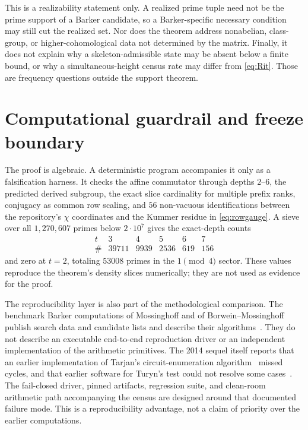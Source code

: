 \documentclass[11pt]{article}
\theoremstyle{definition}
\theoremstyle{remark}
\begin{document}
This is a realizability statement only.  A realized prime tuple need not be
the prime support of a Barker candidate, so a Barker-specific necessary
condition may still cut the realized set.  Nor does the theorem address
nonabelian, class-group, or higher-cohomological data not determined by the
matrix.  Finally, it does not explain why a skeleton-admissible state may be
absent below a finite bound, or why a simultaneous-height census rate may
differ from \eqref{eq:Rit}.  Those are frequency questions outside the
support theorem.

\section{Computational guardrail and freeze boundary}

The proof is algebraic.  A deterministic program accompanies it only as a
falsification harness.  It checks the affine commutator through depths
$2$--$6$, the predicted derived subgroup, the exact slice cardinality for
multiple prefix ranks, conjugacy as common row scaling, and $56$
non-vacuous identifications between the repository's $\chi$ coordinates
and the Kummer residue in \eqref{eq:rowgauge}.  A sieve over all
$1{,}270{,}607$ primes below $2\cdot10^7$ gives the exact-depth counts
\[
\begin{array}{c|rrrrr}
t&3&4&5&6&7\\ \hline
\#&39711&9939&2536&619&156
\end{array}
\]
and zero at $t=2$, totaling $53008$ primes in the $1\pmod4$ sector.  These
values reproduce the theorem's density slices numerically; they are not
used as evidence for the proof.

The reproducibility layer is also part of the methodological comparison.
The benchmark Barker computations of Mossinghoff and of
Borwein--Mossinghoff publish search data and candidate lists and describe
their algorithms~\cite{BM1,BM2}.  They do not describe an executable
end-to-end reproduction driver or an independent implementation of the
arithmetic primitives.  The 2014 sequel itself reports that an earlier
implementation of Tarjan's circuit-enumeration algorithm~\cite{Tarjan}
missed cycles, and that earlier software for Turyn's test could not resolve
some cases~\cite{BM2}.  The fail-closed driver, pinned artifacts, regression
suite, and clean-room arithmetic path accompanying the census are designed
around that documented failure mode.  This is a reproducibility advantage,
not a claim of priority over the earlier computations.
\end{document}
